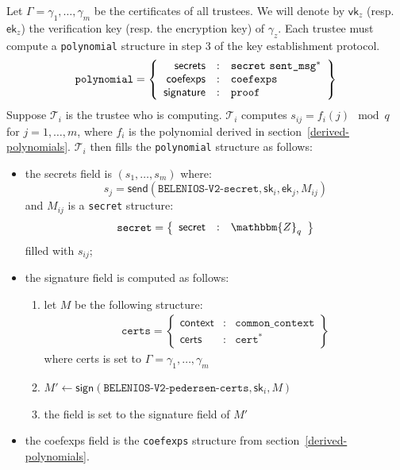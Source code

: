 \documentclass[a4paper]{article}
\newcommand{\dstprefix}{BELENIOS-V2}
\newcommand{\Z}{\mathbbm{Z}}
\begin{document}
Let $\Gamma=\gamma_1,\dotsc,\gamma_m$ be the certificates of all
trustees. We will denote by $\textsf{vk}_z$ (resp. $\textsf{ek}_z$)
the \textsf{verification} key (resp. the \textsf{encryption} key) of
$\gamma_z$. Each trustee must compute a \texttt{polynomial} structure
in step 3 of the key establishment protocol.
\begin{gather*}
  \texttt{polynomial}=\left\{
    \begin{array}{rcl}
      \textsf{secrets}&:&\texttt{secret}\ \texttt{sent\_msg}^\ast\\
      \textsf{coefexps}&:&\texttt{coefexps}\\
      \textsf{signature}&:&\proof
    \end{array}
  \right\}
\end{gather*}
Suppose $\mathcal{T}_i$ is the trustee who is computing.
$\mathcal{T}_i$ computes $s_{ij}=f_i(j)\mod q$ for $j=1,\dotsc,m$,
where $f_i$ is the polynomial derived in
section~\ref{derived-polynomials}. $\mathcal{T}_i$ then fills the
\texttt{polynomial} structure as follows:
\begin{itemize}
\item the \textsf{secrets} field is $(s_1,\dotsc,s_m)$ where:
  \[ s_j =
    \textsf{send}(\texttt{\dstprefix-secret},\textsf{sk}_i,\textsf{ek}_j,M_{ij}) \]
  and $M_{ij}$ is a \texttt{secret} structure:
  \begin{gather*}
    \texttt{secret}=\left\{
      \begin{array}{rcl}
        \textsf{secret}&:&\Z_q
      \end{array}
    \right\}
  \end{gather*}
  filled with $s_{ij}$;
\item the \textsf{signature} field is computed as follows:
  \begin{enumerate}
  \item let $M$ be the following structure:
    \begin{gather*}
      \texttt{certs}=\left\{
        \begin{array}{rcl}
          \textsf{context}&:&\texttt{common\_context}\\
          \textsf{certs}&:&\texttt{cert}^\ast
        \end{array}
      \right\}
    \end{gather*}
    where \textsf{certs} is set to $\Gamma=\gamma_1,\dotsc,\gamma_m$
  \item
    $M'\leftarrow\textsf{sign}(\texttt{\dstprefix-pedersen-certs},\textsf{sk}_i,M)$
  \item the field is set to the \textsf{signature} field of $M'$
  \end{enumerate}
\item the \textsf{coefexps} field is the \texttt{coefexps} structure
  from section~\ref{derived-polynomials}.
\end{itemize}
\end{document}
